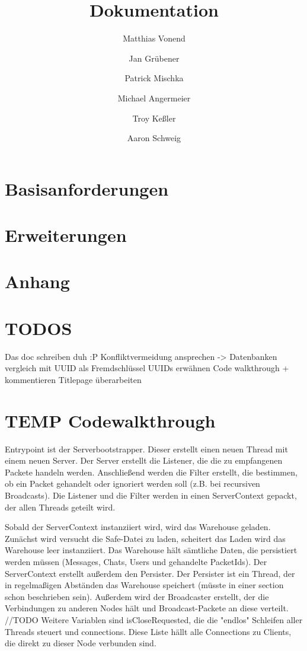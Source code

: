 \documentclass[a4paper]{article}
\title{Dokumentation}
\author{
    Matthias Vonend
    \and
    Jan Grübener
    \and
    Patrick Mischka
    \and
    Michael Angermeier
    \and
    Troy Keßler
    \and
    Aaron Schweig
    \and
}
\theoremstyle{definition}
\begin{document}
    \maketitle
    \tableofcontents

    \vspace{0.2cm}


    \section{Basisanforderungen}
        
    \section{Erweiterungen}
        
    \clearpage
    \section{Anhang}


    \section{TODOS}
        Das doc schreiben duh :P
        Konfliktvermeidung ansprechen -> Datenbanken vergleich mit UUID als Fremdschlüssel
        UUIDs erwähnen
        Code walkthrough + kommentieren
        Titlepage überarbeiten



    \section{TEMP Codewalkthrough}
    Entrypoint ist der Serverbootstrapper. Dieser erstellt einen neuen Thread mit einem neuen Server. Der Server erstellt die Listener, die die zu empfangenen Packete handeln werden. Anschließend werden die Filter erstellt, die bestimmen, ob ein Packet gehandelt oder ignoriert werden soll (z.B. bei recursiven Broadcasts). Die Listener und die Filter werden in einen ServerContext gepackt, der allen Threads geteilt wird.

    Sobald der ServerContext instanziiert wird, wird das Warehouse geladen. Zunächst wird versucht die Safe-Datei zu laden, scheitert das Laden wird das Warehouse leer instanziiert. Das Warehouse hält sämtliche Daten, die persistiert werden müssen (Messages, Chats, Users und gehandelte PacketIds). Der ServerContext erstellt außerdem den Persister. Der Persister ist ein Thread, der in regelmaßigen Abständen das Warehouse speichert (müsste in einer section schon beschrieben sein). Außerdem wird der Broadcaster erstellt, der die Verbindungen zu anderen Nodes hält und Broadcast-Packete an diese verteilt. //TODO
    Weitere Variablen sind isCloseRequested, die die "endlos" Schleifen aller Threads steuert und connections. Diese Liste hällt alle Connections zu Clients, die direkt zu dieser Node verbunden sind.
\end{document}
